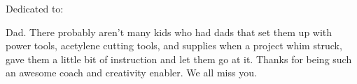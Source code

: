 %
%
\thispagestyle{empty}
{}

\vspace*{3cm}

%

\begin{center}
    Dedicated to:

\par
    Dad.  There probably aren't many kids who had dads that set them up with power tools, acetylene cutting tools, and supplies when a project whim struck, gave them a little bit of instruction and let them go at it.  Thanks for being such an awesome coach and creativity enabler.  We all miss you.

\end{center}
